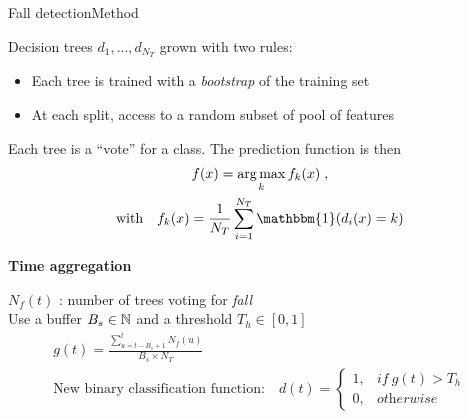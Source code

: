 \begin{frame}{Fall detection}{Method}
\begin{minipage}[t]{0.4\linewidth}
    \vspace{0pt}
    \begin{tcolorbox}[title=Random forest,size=title,boxrule=0.2pt]
        Decision trees $d_1,...,d_{N_T}$ grown with two rules:
        \begin{itemize}
            \item Each tree is trained with a \emph{bootstrap} of the training set
            \item At each split, access to a random subset of pool of features
        \end{itemize}
        Each tree is a ``vote'' for a class.
        The prediction function is then
        \begin{gather*}
        f(x) = \argmax_{k}f_{k}(x)\;,\\
        \text{with} \quad f_{k}(x) = \frac{1}{N_T}\sum_{i=1}^{N_T}\mathbbm{1}(d_i(x)=k)
        \end{gather*}
    \end{tcolorbox}
\end{minipage}\hfill
\begin{minipage}[t]{0.58\linewidth}
    \vspace{0pt}
    \renewcommand{\ratio}{0.5}
    \begin{overlayarea}{\linewidth}{3.4cm} %
    \end{overlayarea}
    
    \textbf{Time aggregation}
    
    $N_f(t)$ : number of trees voting for \emph{fall}\\
    Use a buffer $B_s \in \mathbb{N}$ and a threshold $T_h \in [0, 1]$
    \begin{gather*}
    g(t) = \frac{\sum\limits_{u=t-B_{s}+1}^{t}N_{f}(u)}{B_{s}\times N_{T}}\\
    \text{New binary classification function:} \quad
    d(t) = 
    \begin{cases}
    1, & \textit{if}\ g(t) > T_{h} \\
    0, & \textit{otherwise}
    \end{cases}
    \end{gather*}
\end{minipage}



\end{frame}

